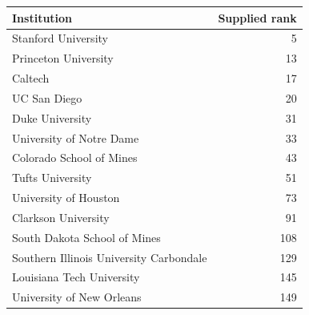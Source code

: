 \begin{tabular}{lr}
\toprule
Institution & Supplied rank \\
\midrule
Stanford University & 5 \\
Princeton University & 13 \\
Caltech & 17 \\
UC San Diego & 20 \\
Duke University & 31 \\
University of Notre Dame & 33 \\
Colorado School of Mines & 43 \\
Tufts University & 51 \\
University of Houston & 73 \\
Clarkson University & 91 \\
South Dakota School of Mines & 108 \\
Southern Illinois University Carbondale & 129 \\
Louisiana Tech University & 145 \\
University of New Orleans & 149 \\
\bottomrule
\end{tabular}
